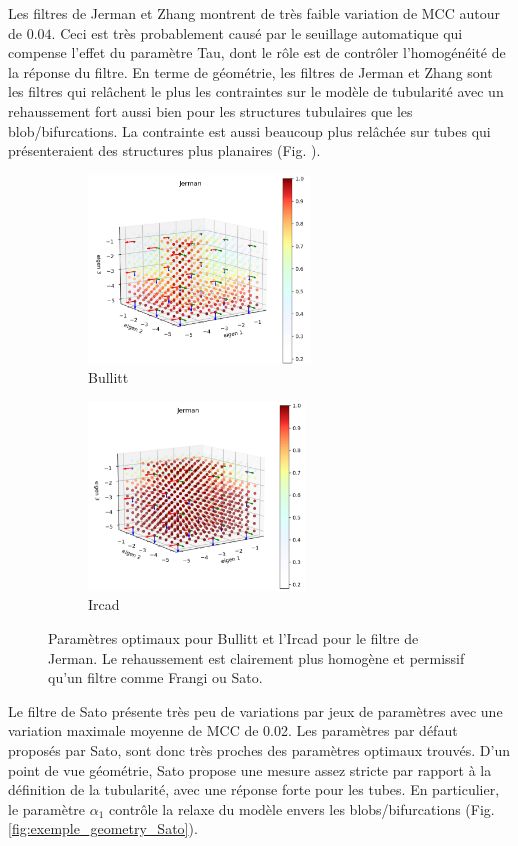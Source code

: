 Les filtres de Jerman et Zhang montrent de très faible variation de MCC autour de $0.04$. Ceci est très probablement causé par le seuillage automatique qui compense l'effet du paramètre Tau, dont le rôle est de contrôler l'homogénéité de la réponse du filtre. En terme de géométrie, les filtres de Jerman et Zhang sont les filtres qui relâchent le plus les contraintes sur le modèle de tubularité avec un rehaussement fort aussi bien pour les structures tubulaires que les blob/bifurcations. La contrainte est aussi beaucoup plus relâchée sur tubes qui présenteraient des structures plus planaires (Fig. \cite{exemple_geometry_jerman}).

\begin{figure}[H]

  \begin{subfigure}[t]{0.45\textwidth}
    \includegraphics[height=5cm]{Images/Bullitt_Jerman_BP.png}
    \caption{Bullitt}
  \end{subfigure}
  \begin{subfigure}[t]{0.45\textwidth}
    \includegraphics[height=5cm]{Images/Ircad_Jerman_BP.png}
    \caption{Ircad}
  \end{subfigure}

  \label{fig:exemple_geometry_jerman}
  \caption{Paramètres optimaux pour Bullitt et l'Ircad pour le filtre de Jerman. Le rehaussement est clairement plus homogène et permissif qu'un filtre comme Frangi ou Sato.}
\end{figure}

Le filtre de Sato présente très peu de variations par jeux de paramètres avec une variation maximale moyenne de MCC de 0.02. Les paramètres par défaut proposés par Sato, sont donc très proches des paramètres optimaux trouvés. D'un point de vue géométrie, Sato propose une mesure assez stricte par rapport à la définition de la tubularité, avec une réponse forte pour les tubes. En particulier, le paramètre $\alpha_1$ contrôle la relaxe du modèle envers les blobs/bifurcations (Fig. \ref{fig:exemple_geometry_Sato}).


